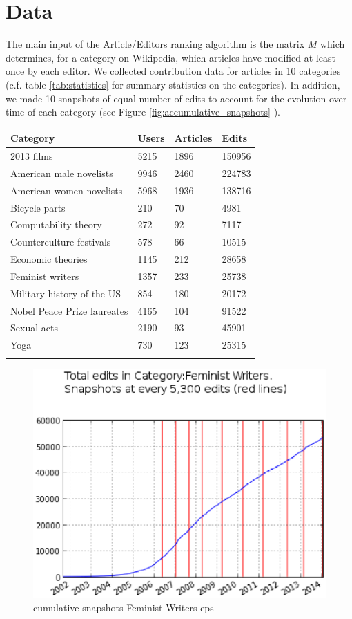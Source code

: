 \section{Data}
The main input of the Article/Editors ranking algorithm is the matrix $M$ which determines, for a category on Wikipedia, which articles have modified at least once by each editor. We collected contribution data for articles in 10 categories (c.f. table \ref{tab:statistics} for summary statistics on the categories). In addition, we made 10 snapshots of equal number of edits to account for the evolution over time of each category (see Figure \ref{fig:accumulative_snapshots}
).

\begin{tabular}{llll}
\toprule
Category & Users & Articles &  Edits \\
\midrule
2013 films &  5215 &     1896 &  150956 \\
American male novelists &  9946 &     2460 &  224783 \\
American women novelists &  5968 &     1936 &  138716 \\
Bicycle parts &   210 &       70 &    4981 \\
Computability theory &   272 &       92 &    7117 \\
Counterculture festivals &   578 &       66 &   10515 \\
Economic theories &  1145 &      212 &   28658 \\
Feminist writers &  1357 &      233 &   25738 \\
Military history of the US &   854 &      180 &   20172 \\
Nobel Peace Prize laureates &  4165 &      104 &   91522 \\
Sexual acts &  2190 &       93 &   45901 \\
Yoga &   730 &      123 &   25315 \\
\bottomrule
\label{tab:statistics}
\end{tabular}

\begin{figure}[!t]
\centering
\includegraphics[width=0.9\columnwidth]{Figures/cumulative_snapshots_Feminist_Writers.eps}
\caption{cumulative snapshots Feminist Writers eps }
\label{fig:figure1}
\end{figure}

